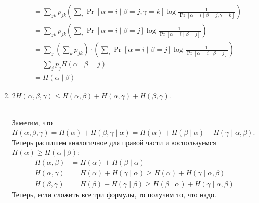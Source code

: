 \begin{prop}
\begin{enumerate}
\begin{proof*}
\begin{align*}
		            &= \sum_{jk} p_{jk} \left( 
		                \sum_i \Pr[\alpha = i \mid \beta = j, \gamma = k] \log \frac{1}{\Pr[\alpha = i \mid \beta = j, \gamma = k]}
		            \right) \\
		            &= \sum_{jk} p_{jk} \left( 
		                \sum_i \Pr[\alpha = i \mid \beta = j] \log \frac{1}{\Pr[\alpha = i \mid \beta = j]}
		            \right)
		            \tag{по независимости} \\
		            &= \sum_j \left( \sum_k p_{jk} \right) \cdot \left( 
		                \sum_i \Pr[\alpha = i \mid \beta = j] \log \frac{1}{\Pr[\alpha = i \mid \beta = j]}
		            \right) \\
		            &= \sum_{j} p_{j} H(\alpha \mid \beta = j) \\
		            &= H(\alpha \mid \beta)
		        \end{align*}
		    \end{proof*}
		\item 
			$ 2H( \alpha , \beta , \gamma ) \le H( \alpha , \beta ) + H( \alpha,  \gamma ) + H( \beta , \gamma ).$
		\begin{proof*}\\
		 Заметим, что $H(\alpha, \beta, \gamma) = H(\alpha) + H(\beta, \gamma \mid \alpha) = H(\alpha) + H(\beta \mid \alpha) + H(\gamma \mid \alpha, \beta)$.\\
		 Теперь распишем аналогичное для правой части и воспользуемся $H(\alpha) \ge H(\alpha \mid \beta)$:
		 \begin{align*}
		     H(\alpha, \beta) &= H(\alpha) + H(\beta \mid \alpha)\\
		     H(\alpha, \gamma) &= H(\alpha) + H(\gamma \mid \alpha) \ge H(\alpha) + H(\gamma \mid \alpha, \beta)\\
		     H(\beta, \gamma) &= H(\beta) + H(\gamma \mid \beta) \ge H(\beta \mid \alpha) + H(\gamma \mid \alpha, \beta)
		 \end{align*}
		 Теперь, если сложить все три формулы, то получим то, что надо.
		\end{proof*}
		
    \end{enumerate} 
\end{prop}


